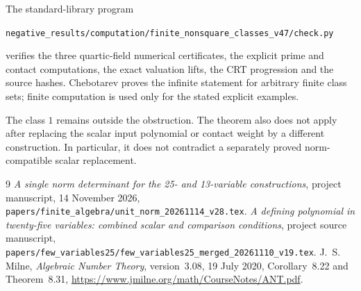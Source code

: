 \documentclass[11pt,a4paper]{article}
\begin{document}
The standard-library program
\begin{center}\small
\nolinkurl{negative_results/computation/finite_nonsquare_classes_v47/check.py}
\end{center}
verifies the three quartic-field numerical certificates, the explicit
prime and contact computations, the exact valuation lifts, the CRT
progression and the source hashes. Chebotarev proves the infinite
statement for arbitrary finite class sets; finite computation is used
only for the stated explicit examples.

The class $1$ remains outside the obstruction. The theorem also does
not apply after replacing the scalar input polynomial or contact weight
by a different construction. In particular, it does not contradict a
separately proved norm-compatible scalar replacement.

\begin{thebibliography}{9}
\emph{A single norm determinant for the 25- and 13-variable constructions},
project manuscript, 14 November 2026,
\nolinkurl{papers/finite_algebra/unit_norm_20261114_v28.tex}.
\emph{A defining polynomial in twenty-five variables: combined scalar
and comparison conditions}, project source manuscript,
\nolinkurl{papers/few_variables25/few_variables25_merged_20261110_v19.tex}.
J.~S. Milne, \emph{Algebraic Number Theory}, version~3.08,
19 July 2020, Corollary~8.22 and Theorem~8.31,
\url{https://www.jmilne.org/math/CourseNotes/ANT.pdf}.
\end{thebibliography}
\end{document}
